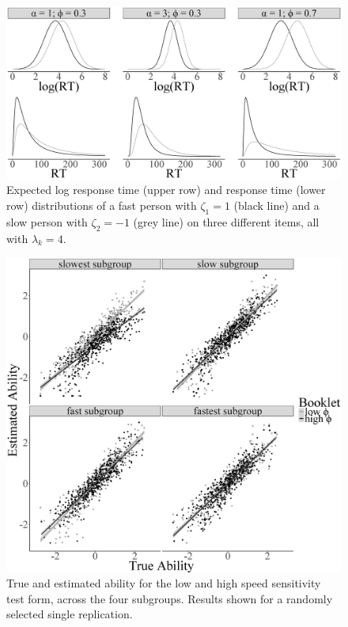 \documentclass[a4paper,man,floatsintext,donotrepeattitle]{apa6}
\begin{document}
\begin{figure} [htb]
	\begin{center}
	 \includegraphics[height = 0.30\textheight]{discrimination_comp.eps}
	\end{center}		
	 \caption{Expected log response time (upper row) and response time (lower row) distributions of a fast person with $\zeta_1 = 1$ (black line) and a slow person with $\zeta_2 = -1$ (grey line) on three different items, all with $\lambda_k = 4$.} 
	 \label{fig:discr_diff}
\end{figure}


\begin{figure} [!htb]	
	\begin{center}
		\includegraphics[height = 0.4\textheight]{abil_subGroup.eps}
	\end{center}
		\caption{True and estimated ability for the low and high speed sensitivity test form, across the four subgroups. Results shown for a randomly selected single replication.}	
		\label{fig:abil}
\end{figure}
\end{document}
